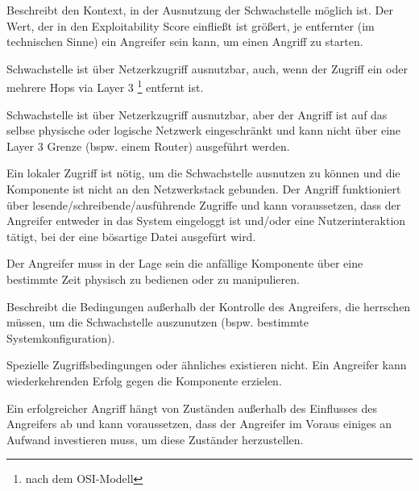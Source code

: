     \begin{description}[itemsep=0.7em,align=left,labelindent=0pt,leftmargin=0pt]
        \item [Attack Vector:] Beschreibt den Kontext, in der Ausnutzung der Schwachstelle möglich ist.
            Der Wert, der in den Exploitability Score einfließt ist größert, je entfernter (im technischen Sinne) ein Angreifer sein kann, um einen Angriff zu starten.
            \begin{description}[noitemsep,align=left,labelindent=0.7cm,leftmargin=0.7cm]
                \item [Network:] Schwachstelle ist über Netzerkzugriff ausnutzbar, auch, wenn der Zugriff ein oder mehrere Hops via Layer 3
                \footnote{nach dem OSI-Modell}
                entfernt ist. 
                \item [Adjacent:] Schwachstelle ist über Netzerkzugriff ausnutzbar, aber der Angriff ist auf das selbse physische oder logische Netzwerk eingeschränkt und kann nicht über eine Layer 3 Grenze (bspw. einem Router) ausgeführt werden.
                \item [Local:] Ein lokaler Zugriff ist nötig, um die Schwachstelle ausnutzen zu können und die Komponente ist nicht an den Netzwerkstack gebunden.
                Der Angriff funktioniert über lesende/schreibende/ausführende Zugriffe und kann voraussetzen, dass der Angreifer entweder in das System eingeloggt ist und/oder eine Nutzerinteraktion tätigt, bei der eine bösartige Datei ausgefürt wird.
                \item [Physical:] Der Angreifer muss in der Lage sein die anfällige Komponente über eine bestimmte Zeit physisch zu bedienen oder zu manipulieren.
            \end{description}
        \item [Attack Complexity:] Beschreibt die Bedingungen außerhalb der Kontrolle des Angreifers, die herrschen müssen, um die Schwachstelle auszunutzen (bspw. bestimmte Systemkonfiguration).
            \begin{description}[noitemsep,align=left,labelindent=0.7cm,leftmargin=0.7cm]
                \item [Low:] Spezielle Zugriffsbedingungen oder ähnliches existieren nicht.
                Ein Angreifer kann wiederkehrenden Erfolg gegen die Komponente erzielen.
                \item [High:] Ein erfolgreicher Angriff hängt von Zuständen außerhalb des Einflusses des Angreifers ab und kann voraussetzen, dass der Angreifer im Voraus einiges an Aufwand investieren muss, um diese Zuständer herzustellen.

\end{description}
\end{description}
